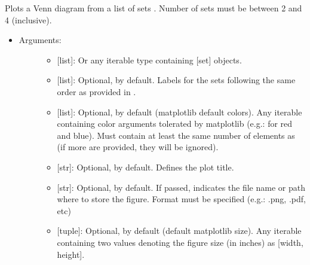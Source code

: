 \documentclass[letterpaper,10pt,english]{sphinxmanual}
\begin{document}
\begin{fulllineitems}
\label{\detokenize{plots:data_tools.plots.venn}}
Plots a Venn diagram from a list of sets . Number of sets must be
between 2 and 4 (inclusive).
\begin{itemize}
\item {} \begin{description}
\item[{Arguments:}] \leavevmode\begin{itemize}
\item {} 
 {[}list{]}: Or any iterable type containing {[}set{]} objects.

\item {} 
 {[}list{]}: Optional, \sphinxcode{\sphinxupquote{{[}'A', 'B', 'C', 'D'{]}}} by
default. Labels for the sets following the same order as
provided in .

\item {} 
 {[}list{]}: Optional, \sphinxcode{\sphinxupquote{{[}'C0', 'C1' 'C2', 'C3'{]}}} by default
(matplotlib default colors). Any iterable containing color
arguments tolerated by matplotlib (e.g.: \sphinxcode{\sphinxupquote{{[}'r', 'b'{]}}} for
red and blue). Must contain at least the same number of
elements as  (if more are provided, they will be ignored).

\item {} 
 {[}str{]}: Optional,  by default. Defines the plot
title.

\item {} 
 {[}str{]}: Optional,  by default. If passed,
indicates the file name or path where to store the figure.
Format must be specified (e.g.: .png, .pdf, etc)

\item {} 
 {[}tuple{]}: Optional,  by default (default
matplotlib size). Any iterable containing two values denoting
the figure size (in inches) as {[}width, height{]}.

\end{itemize}


\end{description}
\end{itemize}
\end{fulllineitems}
\end{document}
